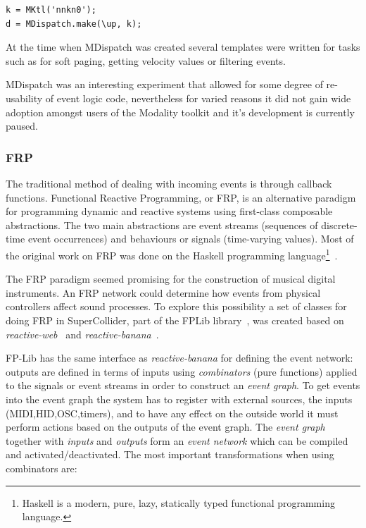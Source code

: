 \documentclass{article}
\begin{document}
\begin{Verbatim}
k = MKtl('nnkn0');
d = MDispatch.make(\up, k);
\end{Verbatim}

At the time when MDispatch was created several templates were written for tasks such as for soft paging, getting velocity values or filtering events. 

MDispatch was an interesting experiment that allowed for some degree of re-usability of event logic code, nevertheless for varied reasons it did not gain wide adoption amongst users of the Modality toolkit and it's development is currently paused.
		
\subsubsection{FRP}
\label{sub:frp}

The traditional method of dealing with incoming events is through callback functions. Functional Reactive Programming, or FRP, is an alternative paradigm for programming dynamic and reactive systems using first-class composable abstractions. The two main abstractions are event streams (sequences of discrete-time event occurrences) and behaviours or signals (time-varying values). Most of the original work on FRP was done on the Haskell programming language\footnote{Haskell is a modern, pure, lazy, statically typed functional programming language.}~\cite{elliott1997-fun,elliott2009-pus,hudak2003-arr,courtney2003yampa}.

The FRP paradigm seemed promising for the construction of musical digital instruments. An FRP network could determine how events from physical controllers affect sound processes. To explore this possibility a set of classes for doing FRP in SuperCollider, part of the FPLib library~\cite{-fpl}, was created based on \emph{reactive-web}~\cite{-reactive-web} and \emph{reactive-banana}~\cite{-reactive-banana}.
 
FP-Lib has the same interface as \emph{reactive-banana} for defining the event network: outputs are defined in terms of inputs using \emph{combinators} (pure functions) applied to the signals or event streams in order to construct an \emph{event graph}. To get events into the event graph the system has to register with external sources, the inputs (MIDI,HID,OSC,timers), and to have any effect on the outside world it must perform actions based on the outputs of the event graph. The \emph{event graph} together with \emph{inputs} and \emph{outputs} form an \emph{event network} which can be compiled and activated/deactivated. The most important transformations when using combinators are:
\end{document}

